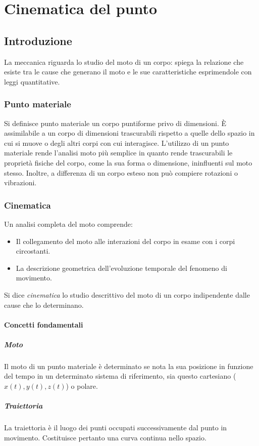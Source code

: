 \documentclass[class=book, crop=false, oneside, 12pt]{standalone}
\begin{document}
\chapter{Cinematica del punto}

\section{Introduzione}
La meccanica riguarda lo studio del moto di un corpo: spiega la relazione che esiste tra le cause che generano il moto e le sue caratteristiche esprimendole con leggi quantitative.
  \subsection{Punto materiale}
  Si definisce punto materiale un corpo puntiforme privo di dimensioni.
  \`E assimilabile a un corpo di dimensioni trascurabili rispetto a quelle dello spazio in cui si muove o degli altri corpi con cui interagisce.
  L'utilizzo di un punto materiale rende l'analisi moto pi\`u semplice in quanto rende trascurabili le propriet\`a fisiche del corpo, come la sua forma o dimensione, ininfluenti sul moto stesso.
    Inoltre, a differenza di un corpo esteso non pu\`o compiere rotazioni o vibrazioni.
  \subsection{Cinematica}
  Un analisi completa del moto comprende:
    \begin{itemize}
      \item Il collegamento del moto alle interazioni del corpo in esame con i corpi circostanti.
      \item La descrizione geometrica dell'evoluzione temporale del fenomeno di movimento.
    \end{itemize}
  Si dice \emph{cinematica} lo studio descrittivo del moto di un corpo indipendente dalle cause che lo determinano.
    \subsubsection{Concetti fondamentali}
      \paragraph{Moto}
      Il moto di un punto materiale \`e determinato se nota la sua posizione in funzione del tempo in un determinato sistema di riferimento, sia questo cartesiano (\(x(t), y(t), z(t)\)) o polare.
      \paragraph{Traiettoria}
      La traiettoria \`e il luogo dei punti occupati successivamente dal punto in movimento.
      Costituisce pertanto una curva continua nello spazio.
\end{document}
